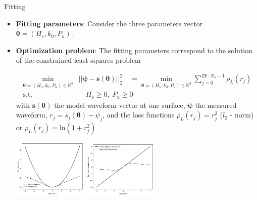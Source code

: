 \documentclass[compress,8pt]{beamer}
\begin{document}
\begin{frame}{Fitting}
 
 
\begin{itemize}
 \item {\bf Fitting parameters}: Consider the three parameters vector $\bm{\theta}=(H_s, k_0, P_u)$.
 
 
 \item {\bf Optimization problem}: The fitting parameters correspond to the solution of the constrained least-squares problem

 \begin{equation*}
\begin{aligned}
\min_{\bm{\theta}=(H_s, k_0, P_u)\in\mathbb{R}^3} &|| \bm{\psi} - \bm{s}(\bm{\theta})||_2^2\quad = \min_{\bm{\theta}=(H_s, k_0, P_u)\in\mathbb{R}^3}\sum\limits_{j=0}^{\texttt{ZP}\cdot N_s-1}\rho_L(r_j) \\
\text{s.t.} \quad &\quad H_s \geq 0 ,\; P_u \geq 0
 \label{eq:lsq_problem}
\end{aligned}
 \end{equation*}
with $\bm{s}(\bm{\theta})$ the model waveform vector at one surface, $\bm{\psi}$ the measured waveform, $r_j=s_j(\bm{\theta})-\psi_j$, and the loss functions $\rho_L(r_j)=r_j^2$ ($l_2$ - norm) or $\rho_L(r_j)=\text{ln}(1+r_j^2)$ 
 
 \medskip
 \centering
\includegraphics[width=0.28\textwidth]{fig/loss_functions}  \includegraphics[width=0.28\textwidth]{fig/loss_functions_derivative}
 
\end{itemize}

 
\end{frame}
\end{document}
